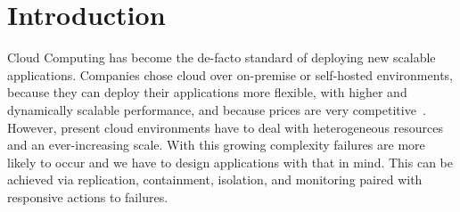 
\section{Introduction}\label{sec:introduction}

  Cloud Computing has become the de-facto standard of deploying new scalable applications.
  Companies chose cloud over on-premise or self-hosted environments, because they can deploy their applications more flexible, with higher and dynamically scalable performance, and because prices are very competitive~\cite{ToffettiMicroservices}.
  However, present cloud environments have to deal with heterogeneous resources and an ever-increasing scale.
  With this growing complexity failures are more likely to occur and we have to design applications with that in mind.
  This can be achieved via replication, containment, isolation, and monitoring paired with responsive actions to failures.
  

